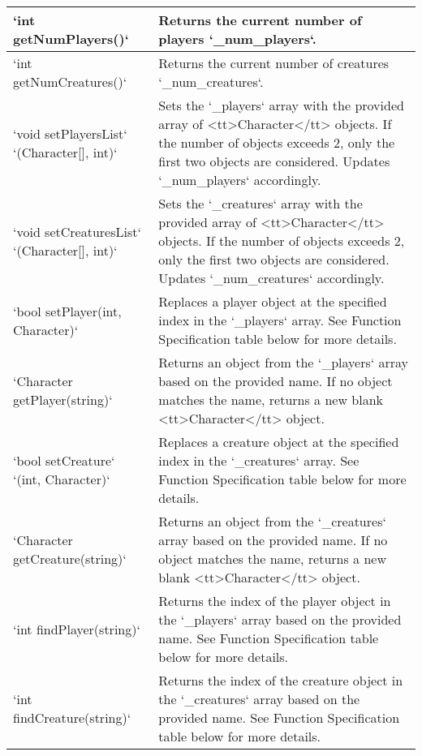 {{{{{{{{{{{\begin{longtable}{|p{2.0in}|p{4.0in}|}
`int getNumPlayers()` & Returns the current number of players `_num_players`. \\ \hline

`int getNumCreatures()` & Returns the current number of creatures `_num_creatures`. \\ \hline

`void setPlayersList` \newline `(Character[], int)` & Sets the `_players` array with the provided array of <tt>Character</tt> objects. If the number of objects exceeds 2, only the first two objects are considered. Updates `_num_players` accordingly. \\ \hline

`void setCreaturesList` \newline `(Character[], int)` & Sets the `_creatures` array with the provided array of <tt>Character</tt> objects. If the number of objects exceeds 2, only the first two objects are considered. Updates `_num_creatures` accordingly. \\ \hline

`bool setPlayer(int, Character)` & Replaces a player object at the specified index in the `_players` array. See Function Specification table below for more details. \\ \hline

`Character getPlayer(string)` & Returns an object from the `_players` array based on the provided name. If no object matches the name, returns a new blank <tt>Character</tt> object. \\ \hline

`bool setCreature` \newline `(int, Character)` & Replaces a creature object at the specified index in the `_creatures` array. See Function Specification table below for more details. \\ \hline

`Character getCreature(string)` & Returns an object from the `_creatures` array based on the provided name. If no object matches the name, returns a new blank <tt>Character</tt> object. \\ \hline

`int findPlayer(string)` & Returns the index of the player object in the `_players` array based on the provided name. See Function Specification table below for more details. \\ \hline

`int findCreature(string)` & Returns the index of the creature object in the `_creatures` array based on the provided name. See Function Specification table below for more details. \\ \hline


\end{longtable}}}}}}}}}}}}
